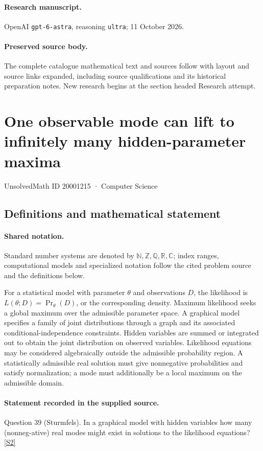 \documentclass[11pt]{article}
\begin{document}
\paragraph{Research manuscript.} OpenAI \texttt{gpt-6-astra}, reasoning \texttt{ultra}; 11 October 2026.
\paragraph{Preserved source body.} The complete catalogue mathematical text and sources follow with layout and source links expanded, including source qualifications and its historical preparation notes. New research begins at the section headed Research attempt.

\section{One observable mode can lift to infinitely many hidden-parameter maxima}\label{20001215}
{\small UnsolvedMath ID 20001215 · Computer Science}
\subsection{Definitions and mathematical statement}

\paragraph{Shared notation.}Standard number systems are denoted by $\mathbb N,\mathbb Z,\mathbb Q,\mathbb R,\mathbb C$; index ranges, computational models and specialized notation follow the cited problem source and the definitions below.


For a statistical model with parameter $\theta$ and observations $D$, the likelihood is $L(\theta;D)=\Pr_\theta(D)$, or the corresponding density. Maximum likelihood seeks a global maximum over the admissible parameter space. A graphical model specifies a family of joint distributions through a graph and its associated conditional-independence constraints. Hidden variables are summed or integrated out to obtain the joint distribution on observed variables. Likelihood equations may be considered algebraically outside the admissible probability region. A statistically admissible real solution must give nonnegative probabilities and satisfy normalization; a mode must additionally be a local maximum on the admissible domain.
\paragraph{Statement recorded in the supplied source.}
Question 39 (Sturmfels). In a graphical model with hidden variables how many (nonneg-ative) real modes might exist in solutions to the likelihood equations? \href{https://aimath.org/WWN/compalgstat/compalgstat.pdf}{[S2]}
\end{document}
